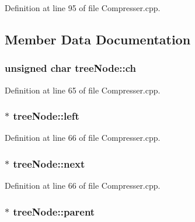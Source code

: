 \-Definition at line 95 of file \-Compresser.\-cpp.



\subsection{\-Member \-Data \-Documentation}
\hypertarget{structtree_node_af17cd0f068fbf7bb84907b320b150c72}{
\subsubsection[{ch}]{\setlength{\rightskip}{0pt plus 5cm}unsigned char {\bf tree\-Node\-::ch}}}\label{structtree_node_af17cd0f068fbf7bb84907b320b150c72}


\-Definition at line 65 of file \-Compresser.\-cpp.

\hypertarget{structtree_node_a5fd8d599cac4372683e70c3d7d01e9ab}{
\subsubsection[{left}]{ $\ast$ {\bf tree\-Node\-::left}}}\label{structtree_node_a5fd8d599cac4372683e70c3d7d01e9ab}


\-Definition at line 66 of file \-Compresser.\-cpp.

\hypertarget{structtree_node_a8f2a1528b19b54c5725ccc3a4dac7416}{
\subsubsection[{next}]{ $\ast$ {\bf tree\-Node\-::next}}}\label{structtree_node_a8f2a1528b19b54c5725ccc3a4dac7416}


\-Definition at line 66 of file \-Compresser.\-cpp.

\hypertarget{structtree_node_a1402205d6cade9ae112ddbb35a96e937}{
\subsubsection[{parent}]{ $\ast$ {\bf tree\-Node\-::parent}}}\label{structtree_node_a1402205d6cade9ae112ddbb35a96e937}


